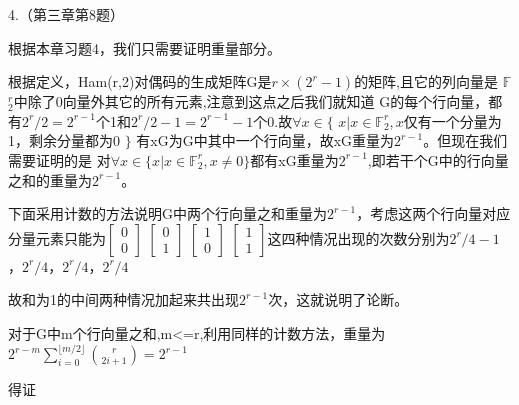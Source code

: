 \documentclass{ctexart}
\begin{document}
	4.（第三章第8题）
	
	根据本章习题4，我们只需要证明重量部分。
	
	根据定义，Ham(r,2)对偶码的生成矩阵G是$r\times(2^r-1)$的矩阵,且它的列向量是
	$\mathbb{F}$$_{2}^{r}$中除了0向量外其它的所有元素,注意到这点之后我们就知道
	G的每个行向量，都有$2^r/2=2^{r-1}$个1和$2^r/2-1=2^{r-1}-1$个0.故$\forall x \in \{$   $x|x \in \mathbb{F}_{2}^{r},x$仅有一个分量为1，剩余分量都为0 $\}$ 有xG为G中其中一个行向量，故xG重量为$2^{r-1}$。但现在我们需要证明的是
	对$\forall x \in \{x|x \in \mathbb{F}_{2}^{r},x\neq0\}$都有xG重量为$2^{r-1}$,即若干个G中的行向量之和的重量为$2^{r-1}$。
	
	下面采用计数的方法说明G中两个行向量之和重量为$2^{r-1}$，考虑这两个行向量对应分量元素只能为$\begin{bmatrix}
		0 \\
		0 
	\end{bmatrix}$ $\begin{bmatrix}
	0 \\
	1 
\end{bmatrix}$ $\begin{bmatrix}
1 \\
0 
\end{bmatrix}$ $\begin{bmatrix}
1\\
1 
\end{bmatrix}$这四种情况出现的次数分别为$2^r/4-1$，$2^r/4$，$2^r/4$，$2^r/4$

故和为1的中间两种情况加起来共出现$2^{r-1}$次，这就说明了论断。

对于G中m个行向量之和,m<=r,利用同样的计数方法，重量为$2^{r-m}\sum_{i=0}^{\lfloor m/2 \rfloor}\binom{r}{2i+1}=2^{r-1}$

得证
   
\end{document}
